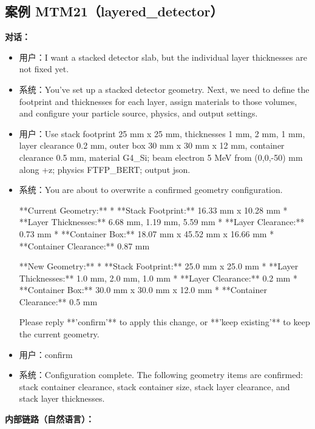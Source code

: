\documentclass[11pt]{ctexart}
\begin{document}
\subsection{案例 MTM21（layered\_detector）}
\textbf{对话：}
\begin{itemize}
\item 用户：I want a stacked detector slab, but the individual layer thicknesses are not fixed yet.
\item 系统：You've set up a stacked detector geometry. Next, we need to define the footprint and thicknesses for each layer, assign materials to those volumes, and configure your particle source, physics, and output settings.
\item 用户：Use stack footprint 25 mm x 25 mm, thicknesses 1 mm, 2 mm, 1 mm, layer clearance 0.2 mm, outer box 30 mm x 30 mm x 12 mm, container clearance 0.5 mm, material G4\_Si; beam electron 5 MeV from (0,0,-50) mm along +z; physics FTFP\_BERT; output json.
\item 系统：You are about to overwrite a confirmed geometry configuration.

**Current Geometry:**
*   **Stack Footprint:** 16.33 mm x 10.28 mm
*   **Layer Thicknesses:** 6.68 mm, 1.19 mm, 5.59 mm
*   **Layer Clearance:** 0.73 mm
*   **Container Box:** 18.07 mm x 45.52 mm x 16.66 mm
*   **Container Clearance:** 0.87 mm

**New Geometry:**
*   **Stack Footprint:** 25.0 mm x 25.0 mm
*   **Layer Thicknesses:** 1.0 mm, 2.0 mm, 1.0 mm
*   **Layer Clearance:** 0.2 mm
*   **Container Box:** 30.0 mm x 30.0 mm x 12.0 mm
*   **Container Clearance:** 0.5 mm

Please reply **'confirm'** to apply this change, or **'keep existing'** to keep the current geometry.
\item 用户：confirm
\item 系统：Configuration complete. The following geometry items are confirmed: stack container clearance, stack container size, stack layer clearance, and stack layer thicknesses.
\end{itemize}
\textbf{内部链路（自然语言）：}
\end{document}
